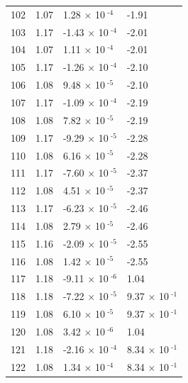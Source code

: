 \documentclass[a4paper,11pt]{article}
\begin{document}
\begin{center}
\begin{longtable}{|R{1.5cm}|R{2.5cm}|R{2.5cm}|R{2.5cm}|}
  102 &   1.07  &         1.28 $\times$ 10$^{\text{          -4}}$  &  -1.91 \\ 
  103 &   1.17  &        -1.43 $\times$ 10$^{\text{          -4}}$  &  -2.01 \\ 
  104 &   1.07  &         1.11 $\times$ 10$^{\text{          -4}}$  &  -2.01 \\ 
  105 &   1.17  &        -1.26 $\times$ 10$^{\text{          -4}}$  &  -2.10 \\ 
  106 &   1.08  &         9.48 $\times$ 10$^{\text{          -5}}$  &  -2.10 \\ 
  107 &   1.17  &        -1.09 $\times$ 10$^{\text{          -4}}$  &  -2.19 \\ 
  108 &   1.08  &         7.82 $\times$ 10$^{\text{          -5}}$  &  -2.19 \\ 
  109 &   1.17  &        -9.29 $\times$ 10$^{\text{          -5}}$  &  -2.28 \\ 
  110 &   1.08  &         6.16 $\times$ 10$^{\text{          -5}}$  &  -2.28 \\ 
  111 &   1.17  &        -7.60 $\times$ 10$^{\text{          -5}}$  &  -2.37 \\ 
  112 &   1.08  &         4.51 $\times$ 10$^{\text{          -5}}$  &  -2.37 \\ 
  113 &   1.17  &        -6.23 $\times$ 10$^{\text{          -5}}$  &  -2.46 \\ 
  114 &   1.08  &         2.79 $\times$ 10$^{\text{          -5}}$  &  -2.46 \\ 
  115 &   1.16  &        -2.09 $\times$ 10$^{\text{          -5}}$  &  -2.55 \\ 
  116 &   1.08  &         1.42 $\times$ 10$^{\text{          -5}}$  &  -2.55 \\ 
  117 &   1.18  &        -9.11 $\times$ 10$^{\text{          -6}}$  &   1.04 \\ 
  118 &   1.18  &        -7.22 $\times$ 10$^{\text{          -5}}$  &         9.37 $\times$ 10$^{\text{          -1}}$ \\ 
  119 &   1.08  &         6.10 $\times$ 10$^{\text{          -5}}$  &         9.37 $\times$ 10$^{\text{          -1}}$ \\ 
  120 &   1.08  &         3.42 $\times$ 10$^{\text{          -6}}$  &   1.04 \\ 
  121 &   1.18  &        -2.16 $\times$ 10$^{\text{          -4}}$  &         8.34 $\times$ 10$^{\text{          -1}}$ \\ 
  122 &   1.08  &         1.34 $\times$ 10$^{\text{          -4}}$  &         8.34 $\times$ 10$^{\text{          -1}}$ \\ 

\end{longtable}
\end{center}
\end{document}
